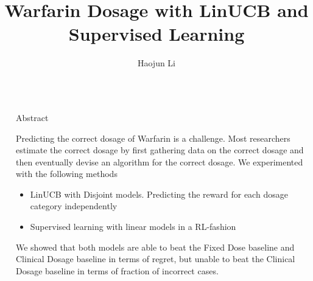 \documentclass[final, 14pt]{beamer}
\title{Warfarin Dosage with LinUCB and Supervised Learning} %
\author{Haojun Li} %
\institute{Department of Computer Science, Stanford University} %
\newlength{\sepwid}
\newlength{\onecolwid}
\begin{document}

\setlength{\belowcaptionskip}{2ex} %
\setlength\belowdisplayshortskip{2ex} %

\begin{frame}[t] %

\begin{columns}[t] %

\begin{column}{\sepwid}\end{column} %

\begin{column}{\onecolwid} %


\begin{alertblock}{Abstract}

Predicting the correct dosage of Warfarin is a challenge. Most researchers estimate the correct dosage by first gathering data on the correct dosage and then eventually devise an algorithm for the correct dosage. \cite{international2009estimation} We experimented with the following methods
\begin{itemize}
	\item LinUCB with Disjoint models. Predicting the reward for each dosage category independently
	\item Supervised learning with linear models in a RL-fashion
\end{itemize}
We showed that both models are able to beat the Fixed Dose baseline and Clinical Dosage baseline in terms of regret, but unable to beat the Clinical Dosage baseline in terms of fraction of incorrect cases.

\end{alertblock}



\end{column}
\end{columns}
\end{frame}
\end{document}
